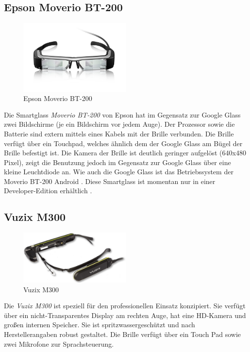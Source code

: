 \subsection{Epson Moverio BT-200}
\label{sec:Epson_Moverio_BT-200}
%
\begin{figure}[htbp]
    \centering
    \includegraphics[width=0.5\textwidth]{data/bilder/Moverio_BT-200.png}
    \caption{Epson Moverio BT-200 \cite{Epson}}
    \label{fig:BT-200}
\end{figure}
%
Die Smartglass \emph{Moverio BT-200} von Epson hat im Gegensatz zur Google Glass zwei Bildschirme (je ein Bildschirm vor jedem Auge). Der Prozessor sowie die Batterie sind extern mittels eines Kabels mit der Brille verbunden. Die Brille verfügt über ein Touchpad, welches ähnlich dem der Google Glass am Bügel der Brille befestigt ist. Die Kamera der Brille ist deutlich geringer aufgelöst (640x480 Pixel), zeigt die Benutzung jedoch im Gegensatz zur Google Glass über eine kleine Leuchtdiode an. Wie auch die Google Glass ist das Betriebssystem der Moverio BT-200 Android \cite[S.~32]{Schwenke2016}. Diese Smartglass ist momentan nur in einer Developer-Edition erhältlich \cite{Epson}.
%
\subsection{Vuzix M300}
%
\begin{figure}[htbp]
    \centering
    \includegraphics[width=0.5\textwidth]{data/bilder/m300-top.png}
    \caption{Vuzix M300 \cite{Vuzix2018}}
    \label{fig:hmt1}
\end{figure}
%
Die \emph{Vuzix M300} ist speziell für den professionellen Einsatz konzipiert. Sie verfügt über ein nicht-Transparentes Display am rechten Auge, hat eine HD-Kamera und großen internen Speicher. Sie ist spritzwassergeschützt und nach Herstellerangaben robust gestaltet. Die Brille verfügt über ein Touch Pad sowie zwei Mikrofone zur Sprachsteuerung. 

